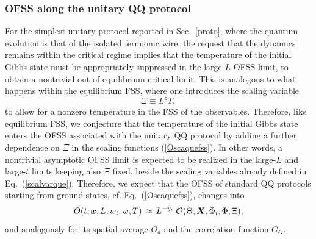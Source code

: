 \subsubsection{OFSS along the unitary QQ protocol}
\label{scalprota}



For the simplest unitary protocol reported in Sec.~\ref{proto}, where
the quantum evolution is that of the isolated fermionic wire, the
request that the dynamics remains within the critical regime implies
that the temperature of the initial Gibbs state must be appropriately
suppressed in the large-$L$ OFSS limit, to obtain a nontrivial
out-of-equilibrium critical limit.  This is analogous to what happens
within the equilibrium FSS, where one introduces the scaling
variable~\cite{SGCS-97,S99,rossini2021coherent}
\begin{equation}
  \Xi \equiv L^z T,
 \label{Xidef}
\end{equation}
to allow for a nonzero temperature in the FSS of the observables.
Therefore, like equilibrium FSS, we conjecture that the temperature of
the initial Gibbs state enters the OFSS associated with the unitary QQ
protocol by adding a further dependence on $\Xi$ in the scaling
functions (\ref{Oscaquefss}).  In other words, a nontrivial asymptotic
OFSS limit is expected to be realized in the large-$L$ and large-$t$
limits keeping also $\Xi$ fixed, beside the scaling variables already
defined in Eq.~(\ref{scalvarque}).  Therefore, we expect that the OFSS
of standard QQ protocols starting from ground states,
cf. Eq.~(\ref{Oscaquefss}), changes into
\begin{eqnarray}
   O(t, {\bm x}, L, w_i, w, T) \, \approx \, L^{-y_o} \, {\cal
    O}(\Theta, {\bm X}, \Phi_i, \Phi, \Xi),
    \label{Oscaquefssa}
\end{eqnarray}
and analogously for its spatial average $O_a$ and the correlation
function $G_O$.

